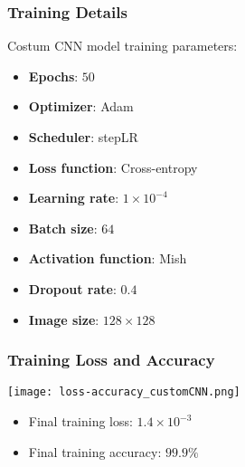 \documentclass[../presentation.tex]{subfiles} %
\begin{document}
\begin{frame}[t]
    
    \frametitle{Training Details}

    Costum CNN model training parameters:
    \vspace{0.2cm}

    \begin{itemize}
			\setlength{\itemsep}{1.5ex}
        \item \textbf{Epochs}: $50$
				\item \textbf{Optimizer}: Adam 
				\item \textbf{Scheduler}: stepLR 
        \item \textbf{Loss function}: Cross-entropy %
        \item \textbf{Learning rate}: $1\times10^{-4}$
				\item \textbf{Batch size}: $64$ 
        \item \textbf{Activation function}: Mish
        \item \textbf{Dropout rate}: $0.4$
        \item \textbf{Image size}: $128\times128$
    \end{itemize}

\end{frame}

\begin{frame}
    
    \frametitle{Training Loss and Accuracy}

    \begin{center}
        \texttt{[image: loss-accuracy\_customCNN.png]}
    \end{center}

    \small{
    \begin{cbox}
        \begin{itemize}
            \item Final training loss: $1.4\times10^{-3}$
            \item Final training accuracy: $99.9\%$
        \end{itemize}
    \end{cbox}
    }

\end{frame}
\end{document}
